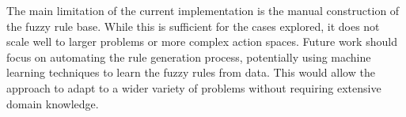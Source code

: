 \documentclass[11pt, a4paper]{article}
\begin{document}
    The main limitation of the current implementation is the manual construction of the fuzzy rule base.
    While this is sufficient for the cases explored, it does not scale well to larger problems or more complex action spaces.
    Future work should focus on automating the rule generation process, potentially using machine learning techniques to learn the fuzzy rules from data.
    This would allow the approach to adapt to a wider variety of problems without requiring extensive domain knowledge.

	\printbibliography
\end{document}
